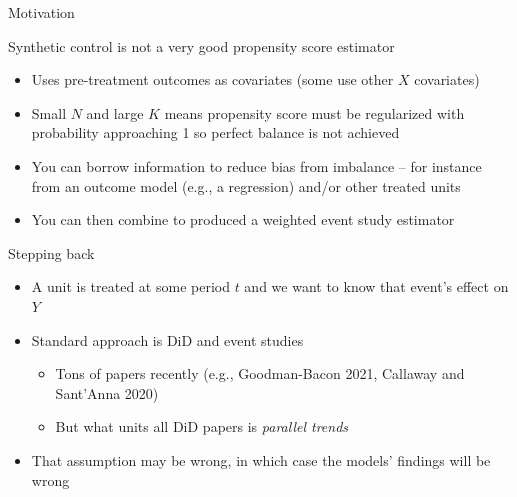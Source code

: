 \documentclass{beamer}
\begin{document}
\begin{frame}{Motivation}


Synthetic control is not a very good propensity score estimator
\begin{itemize}
\item Uses pre-treatment outcomes as covariates (some use other $X$ covariates)
\item Small $N$ and large $K$ means propensity score must be regularized with probability approaching 1 so perfect balance is not achieved
\item You can borrow information to reduce bias from imbalance -- for instance from an outcome model (e.g., a regression) and/or other treated units
\item You can then combine to produced a weighted event study estimator
\end{itemize}

\end{frame}

\begin{frame}{Stepping back}

\begin{itemize}
\item A unit is treated at some period $t$ and we want to know that event's effect on $Y$
\item Standard approach is DiD and event studies
	\begin{itemize}
	\item Tons of papers recently (e.g., Goodman-Bacon 2021, Callaway and Sant'Anna 2020)
	\item But what units all DiD papers is \emph{parallel trends}
	\end{itemize}
\item That assumption may be wrong, in which case the models' findings will be wrong
\end{itemize}

\end{frame}
\end{document}

